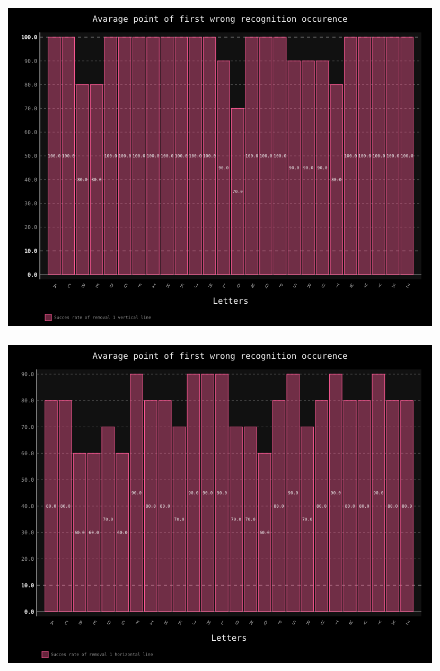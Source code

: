 \documentclass[a4paper]{article}
\begin{document}
\begin{figure}[h!]
	\centering
	\includegraphics[scale=0.7,keepaspectratio=true]{Charts/VerLineTestPlanResultsChart_ClasifierTester.png}	
	\caption{}
	\label{ver_line_clas}
\end{figure}

\begin{figure}[h!]
	\centering
	\includegraphics[scale=0.7,keepaspectratio=true]{Charts/HorLineTestPlanResultsChart_NormalTester.png}	
	\caption{}
	\label{hor_line_trans}
\end{figure}
\end{document}
